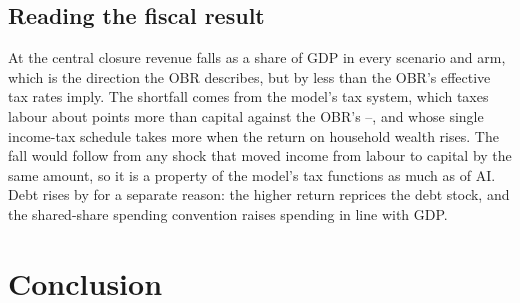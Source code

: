 \subsection{Reading the fiscal result}

At the central closure revenue falls as a share of GDP in every scenario and arm, which is the direction the OBR describes, but by less than the OBR's effective tax rates imply. The shortfall comes from the model's tax system, which taxes labour about \genEffWedgePpCentral{} points more than capital against the OBR's \genObrWedgeLo--\genObrWedgeHi{}, and whose single income-tax schedule takes more when the return on household wealth rises. The fall would follow from any shock that moved income from labour to capital by the same amount, so it is a property of the model's tax functions as much as of AI. Debt rises by \genDebtRuleYear{} for a separate reason: the higher return reprices the debt stock, and the shared-share spending convention raises spending in line with GDP.

\section{Conclusion}
\label{sec:conclusion}

